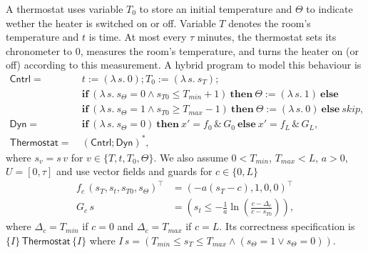 \documentclass[envcountsame,envcountsect]{llncs}
\newcommand{\IF}[3]{\mathbf{if}\ #1\ \mathbf{then}\ #2\ \mathbf{else}\ #3}
\begin{document}
\begin{example}\label{ex:therm-sol}
A thermostat uses variable $T_0$ to store an initial temperature and $\Theta$ to indicate wether the heater is switched on or off. Variable $T$ denotes the room's temperature and $t$ is time. At most every $\tau$ minutes, the thermostat sets its chronometer to $0$, measures 
the room's temperature, and turns the heater on (or off) according to this measurement. A hybrid program to model this behaviour is
\begin{align*}
	\mathsf{Cntrl} = &\ {t:=(\lambda\, s.\ 0)};{T_0:=(\lambda\, s.\ s_T)};\\
				&\ \IF {(\lambda\, s.\ s_\Theta=0 \land s_{T0}\leq T_{min} + 1)} {\Theta:=(\lambda\, s.\ 1)} {}\\
				&\ \IF {(\lambda\, s.\ s_\Theta=1 \land s_{T0}\geq T_{max} - 1)} {\Theta:=(\lambda\, s.\ 0)} {\mathit{skip}},\\
	\mathsf{Dyn} = &\ \IF {(\lambda\, s.\ s_\Theta=0)} {x' = f_0\, \&\, G_0} {x' = f_L\, \&\, G_L},\\
	\mathsf{Thermostat} = &\ (\mathsf{Cntrl}{;}\mathsf{Dyn})^\ast,
\end{align*}
where $s_v=s\, v$ for $v\in\{T,t,T_0,\Theta\}$. We also assume $0<T_{min}$, $T_{max}<L$, $a>0$, $U=[0,\tau]$ and use vector fields and guards for $c\in\{0,L\}$
\begin{align*}
f_c\, (s_T,s_t, s_{T0}, s_\Theta)^\top &= (-a(s_T-c),1,0,0)^\top\\
G_c\, s  &= \left(s_t\leq -\frac{1}{a}\ln\left(\frac{c-\Delta_c}{c-s_{T0}}\right)\right),
\end{align*}
where $\Delta_c=T_{min}$ if $c=0$ and $\Delta_c = T_{max}$ if $c=L$. Its correctness specification is $\{I\}\, \mathsf{Thermostat}\, \{I\}$ where $I\, s=\left(T_{min}\leq s_T\leq T_{max}\land (s_\Theta = 1 \lor s_\Theta=0)\right)$.


\end{example}
\end{document}

